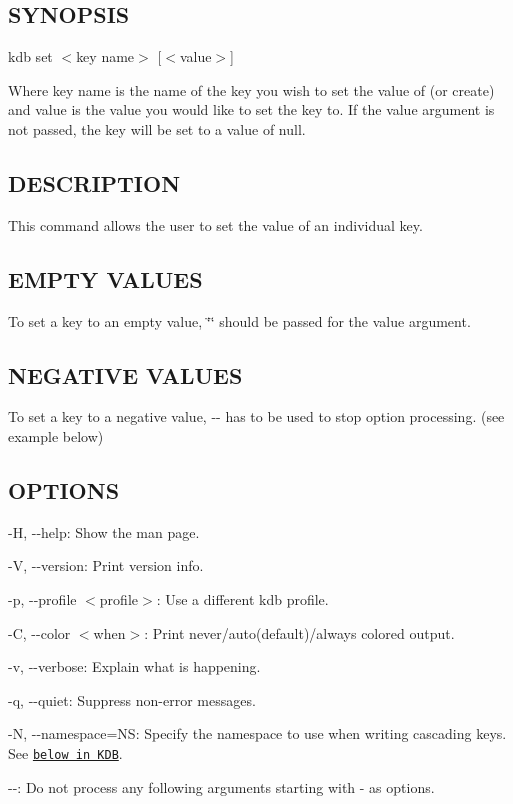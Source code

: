 \subsection*{S\+Y\+N\+O\+P\+S\+IS}

{\ttfamily kdb set $<$key name$>$ \mbox{[}$<$value$>$\mbox{]}}

Where {\ttfamily key name} is the name of the key you wish to set the value of (or create) and {\ttfamily value} is the value you would like to set the key to. If the {\ttfamily value} argument is not passed, the key will be set to a value of {\ttfamily null}.

\subsection*{D\+E\+S\+C\+R\+I\+P\+T\+I\+ON}

This command allows the user to set the value of an individual key.

\subsection*{E\+M\+P\+TY V\+A\+L\+U\+ES}

To set a key to an empty value, {\ttfamily \char`\"{}\char`\"{}} should be passed for the {\ttfamily value} argument.

\subsection*{N\+E\+G\+A\+T\+I\+VE V\+A\+L\+U\+ES}

To set a key to a negative value, {\ttfamily -\/-\/} has to be used to stop option processing. (see example below)

\subsection*{O\+P\+T\+I\+O\+NS}


\begin{DoxyItemize}
\item {\ttfamily -\/H}, {\ttfamily -\/-\/help}\+: Show the man page.
\item {\ttfamily -\/V}, {\ttfamily -\/-\/version}\+: Print version info.
\item {\ttfamily -\/p}, {\ttfamily -\/-\/profile $<$profile$>$}\+: Use a different kdb profile.
\item {\ttfamily -\/C}, {\ttfamily -\/-\/color $<$when$>$}\+: Print never/auto(default)/always colored output.
\item {\ttfamily -\/v}, {\ttfamily -\/-\/verbose}\+: Explain what is happening.
\item {\ttfamily -\/q}, {\ttfamily -\/-\/quiet}\+: Suppress non-\/error messages.
\item {\ttfamily -\/N}, {\ttfamily -\/-\/namespace=NS}\+: Specify the namespace to use when writing cascading keys. See \href{#KDB}{\tt below in K\+DB}.
\item {\ttfamily -\/-\/}\+: Do not process any following arguments starting with {\ttfamily -\/} as options.
\end{DoxyItemize}

